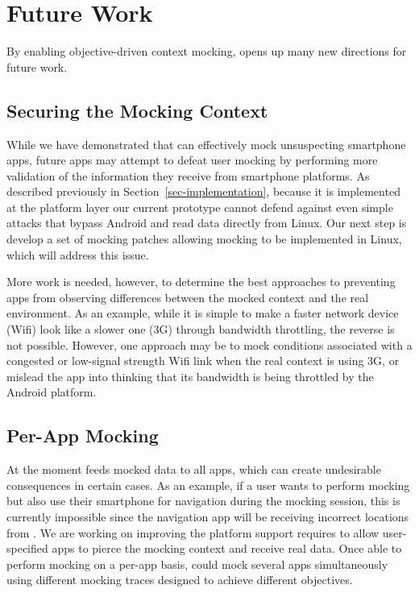 \section{Future Work}
\label{sec-future}

By enabling objective-driven context mocking, \PocketMocker{} opens up many
new directions for future work.

\subsection{Securing the Mocking Context}

While we have demonstrated that \PocketMocker{} can effectively mock
unsuspecting smartphone apps, future apps may attempt to defeat user mocking
by performing more validation of the information they receive from smartphone
platforms. As described previously in Section~\ref{sec-implementation},
because it is implemented at the platform layer our current prototype cannot
defend against even simple attacks that bypass Android and read data directly
from Linux. Our next step is develop a set of mocking patches allowing
mocking to be implemented in Linux, which will address this issue.

More work is needed, however, to determine the best approaches to preventing
apps from observing differences between the mocked context and the real
environment. As an example, while it is simple to make a faster network
device (Wifi) look like a slower one (3G) through bandwidth throttling, the
reverse is not possible. However, one approach may be to mock conditions
associated with a congested or low-signal strength Wifi link when the real
context is using 3G, or mislead the app into thinking that its bandwidth is
being throttled by the Android platform.

\subsection{Per-App Mocking}

At the moment \PocketMocker{} feeds mocked data to all apps, which can create
undesirable consequences in certain cases. As an example, if a user wants to
perform mocking but also use their smartphone for navigation during the
mocking session, this is currently impossible since the navigation app will
be receiving incorrect locations from \PocketMocker{}. We are working on
improving the platform support \PocketMocker{} requires to allow
user-specified apps to pierce the mocking context and receive real data. Once
able to perform mocking on a per-app basis, \PocketMocker{} could mock
several apps simultaneously using different mocking traces designed to
achieve different objectives.


